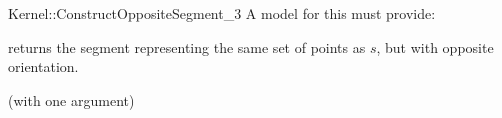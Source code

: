 \begin{ccRefFunctionObjectConcept}{Kernel::ConstructOppositeSegment_3}
A model for this must provide:


{returns the segment representing the same set of points as $s$,
but with opposite orientation.}

\ccRefines
{} (with one argument)

\ccSeeAlso
{} \\

\end{ccRefFunctionObjectConcept}
